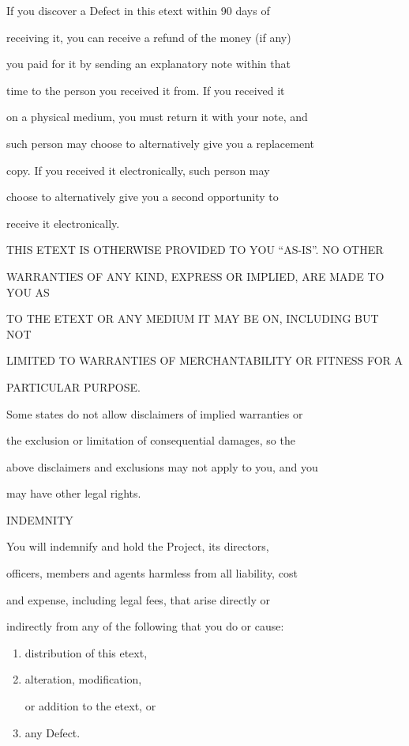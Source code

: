 \documentclass[12pt]{book}
\begin{document}
If you discover a Defect in this etext within 90 days of

receiving it, you can receive a refund of the money (if any)

you paid for it by sending an explanatory note within that

time to the person you received it from.  If you received it

on a physical medium, you must return it with your note, and

such person may choose to alternatively give you a replacement

copy.  If you received it electronically, such person may

choose to alternatively give you a second opportunity to

receive it electronically.



THIS ETEXT IS OTHERWISE PROVIDED TO YOU ``AS-IS''.  NO OTHER

WARRANTIES OF ANY KIND, EXPRESS OR IMPLIED, ARE MADE TO YOU AS

TO THE ETEXT OR ANY MEDIUM IT MAY BE ON, INCLUDING BUT NOT

LIMITED TO WARRANTIES OF MERCHANTABILITY OR FITNESS FOR A

PARTICULAR PURPOSE.



Some states do not allow disclaimers of implied warranties or

the exclusion or limitation of consequential damages, so the

above disclaimers and exclusions may not apply to you, and you

may have other legal rights.



\begin{center}

INDEMNITY

\end{center}



You will indemnify and hold the Project, its directors,

officers, members and agents harmless from all liability, cost

and expense, including legal fees, that arise directly or

indirectly from any of the following that you do or cause:



\begin{enumerate}

\item distribution of this etext,

\item  alteration, modification,

or addition to the etext, or

\item  any Defect.

\end{enumerate}
\end{document}

